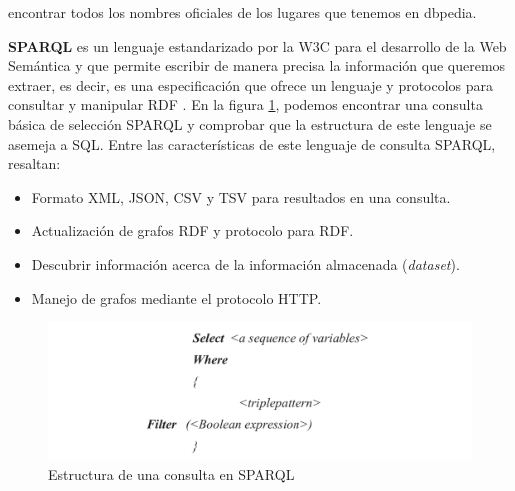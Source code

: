 encontrar todos los nombres oficiales de los lugares que tenemos en dbpedia.

\textbf{SPARQL} es un lenguaje estandarizado por la W3C para el desarrollo de la Web Semántica y que permite escribir de manera precisa la información que queremos extraer, es decir, es una especificación que ofrece un lenguaje y protocolos para consultar y manipular RDF \cite{tesis-otro}. En la figura \ref{fig:sparql}, podemos encontrar una consulta básica de selección SPARQL y comprobar que la estructura de este lenguaje se asemeja a SQL. Entre las características de este lenguaje de consulta SPARQL, resaltan: 

\begin{itemize}
	\item Formato XML, JSON, CSV y TSV  para resultados en una consulta.
	\item Actualización de grafos RDF y protocolo para RDF.
	\item Descubrir información acerca de la información  almacenada (\textit{dataset}).
	\item Manejo de grafos mediante el protocolo HTTP.
\end{itemize}


\begin{figure}[H]
	\centering
	\includegraphics[width=1.1\linewidth]{imagenes/capitulo3/sparql}
	\caption{Estructura de una consulta en SPARQL}
	\label{fig:sparql}
\end{figure}



